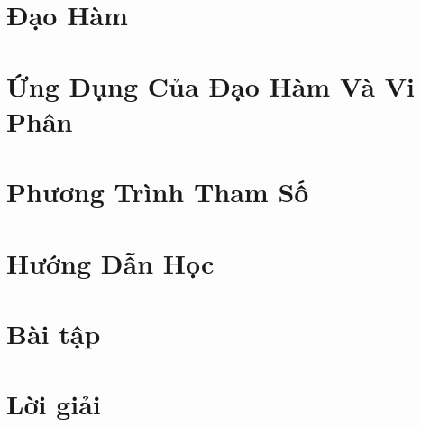 \section{Đạo Hàm}

\section{Ứng Dụng Của Đạo Hàm Và Vi Phân}

\section{Phương Trình Tham Số}

\section{Hướng Dẫn Học}
\section{Bài tập}
\section{Lời giải }

